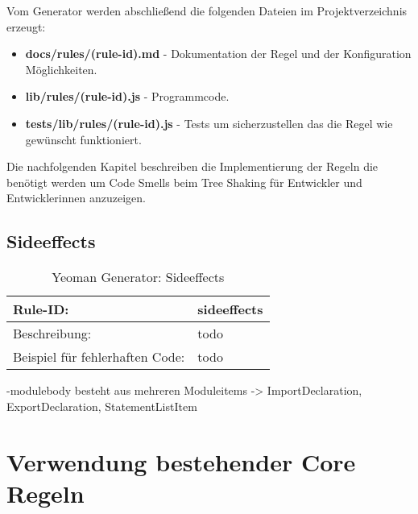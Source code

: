 Vom Generator werden abschließend die folgenden Dateien im Projektverzeichnis erzeugt:
\begin{itemize}
	\item \textbf{docs/rules/(rule-id).md} - Dokumentation der Regel und der Konfiguration Möglichkeiten.
    \item \textbf{lib/rules/(rule-id).js} - Programmcode.
    \item \textbf{tests/lib/rules/(rule-id).js} - Tests um sicherzustellen das die Regel wie gewünscht funktioniert.
\end{itemize}

Die nachfolgenden Kapitel beschreiben die Implementierung der Regeln die benötigt werden um Code Smells beim Tree Shaking für Entwickler und Entwicklerinnen anzuzeigen.

\subsection{Sideeffects}

\begin{table}[h]
\centering
\caption{Yeoman Generator: Sideeffects}
\label{tbl:sideeffects}
\begin{tabular}{|l|l|}
\hline
Rule-ID: & sideeffects \\ \hline
Beschreibung: & todo \\ \hline
Beispiel für fehlerhaften Code: & todo \\ \hline
\end{tabular}
\end{table}

-modulebody besteht aus mehreren Moduleitems -> ImportDeclaration, ExportDeclaration, StatementListItem

\section{Verwendung bestehender Core Regeln}








